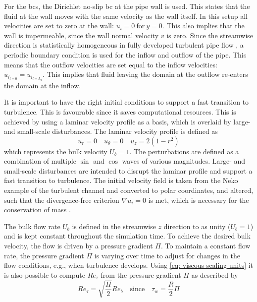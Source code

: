 For the \acrfull{bcs}, the Dirichlet no-slip \acrshort{bc} at the pipe wall is used.
This states that the fluid at the wall  moves with the same velocity as the wall itself. In this setup  all velocities are set to zero at the wall: $u_i = 0 \ \text{for}\ y = 0$.
This also implies that the wall is impermeable, since the wall normal velocity $v$ is zero.
Since the streamwise direction is statistically homogeneous in fully developed turbulent pipe flow \citep{moinDIRECTNUMERICALSIMULATION1998}, a periodic boundary condition is used for the inflow and outflow of the pipe.
This means that the outflow velocities  are set equal to the inflow velocities: $u_{i_{l = 0}} = u_{i_{l=L_z}}$. This implies that fluid leaving the domain at the outflow re-enters the domain at the inflow.


It is important to have the right initial conditions to support a fast transition to turbulence.
This is favourable since it saves computational resources.
This is achieved by using a  laminar velocity profile as a basis, which is overlaid by large- and small-scale disturbances.
The laminar velocity profile is defined as
\begin{equation}\label{eq: laminar velocity profile}
    u_r = 0 \quad u_\theta = 0 \quad u_z = 2(1-r^2)
\end{equation}
which represents the bulk velocity $U_b = 1$.
The perturbations are defined as a combination of multiple $\sin$ and $\cos$ waves of various magnitudes.
Large- and small-scale disturbances are intended to disrupt the laminar profile and support a fast transition to turbulence.
The initial velocity field is taken from the Neko example of the turbulent channel and converted to polar coordinates, and altered, such that the divergence-free criterion $\nabla u_i = 0$ is met, which is necessary for the conservation of mass \citep{popeTurbulentFlows2015}.


The bulk flow rate $U_b$ is defined in the streamwise $z$ direction to as unity ($U_b=1$) and is kept constant throughout the simulation time.
To achieve the desired bulk velocity, the flow is driven by a pressure gradient $\Pi$.
To maintain a constant flow rate, the pressure gradient $\Pi$ is varying over time to adjust for changes in the flow conditions, e.g., when turbulence develops.
Using \autoref{eq: viscous scaling units} it is also possible to compute $Re_\tau$ from the pressure gradient $\Pi$  as described by~\cite{demaioDirectNumericalSimulation2023}
\begin{equation} \label{eq: REtau from forcing}
    Re_\tau = \sqrt{\frac{\Pi}{2}}Re_b \quad \text{since} \quad \tau_w = \frac{R}{2}\Pi 
\end{equation}

